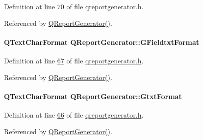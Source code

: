 Definition at line \hyperlink{qreportgenerator_8h_source_l00070}{70} of file \hyperlink{qreportgenerator_8h_source}{qreportgenerator.\+h}.



Referenced by \hyperlink{qreportgenerator_8cpp_source_l00004}{Q\+Report\+Generator()}.

\hypertarget{class_q_report_generator_afa9431684b9e2612f1d508f7e837aec5}{}
\paragraph[{G\+Fieldtxt\+Format}]{\setlength{\rightskip}{0pt plus 5cm}Q\+Text\+Char\+Format Q\+Report\+Generator\+::\+G\+Fieldtxt\+Format\hspace{0.3cm}{\ttfamily [private]}}\label{class_q_report_generator_afa9431684b9e2612f1d508f7e837aec5}


Definition at line \hyperlink{qreportgenerator_8h_source_l00067}{67} of file \hyperlink{qreportgenerator_8h_source}{qreportgenerator.\+h}.



Referenced by \hyperlink{qreportgenerator_8cpp_source_l00004}{Q\+Report\+Generator()}.

\hypertarget{class_q_report_generator_ad78e127d228dd0c11c438d4681a20379}{}
\paragraph[{Gtxt\+Format}]{\setlength{\rightskip}{0pt plus 5cm}Q\+Text\+Char\+Format Q\+Report\+Generator\+::\+Gtxt\+Format\hspace{0.3cm}{\ttfamily [private]}}\label{class_q_report_generator_ad78e127d228dd0c11c438d4681a20379}


Definition at line \hyperlink{qreportgenerator_8h_source_l00066}{66} of file \hyperlink{qreportgenerator_8h_source}{qreportgenerator.\+h}.



Referenced by \hyperlink{qreportgenerator_8cpp_source_l00004}{Q\+Report\+Generator()}.

\hypertarget{class_q_report_generator_ad23921b0c8d0e77db7cfc0b611d9e93c}{}
